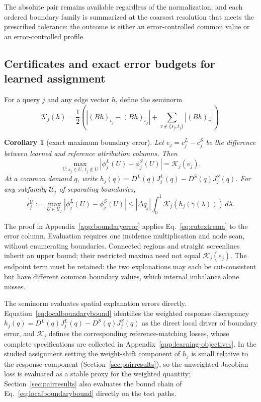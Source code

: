 \documentclass[a4paper,fleqn]{cas-sc}
\newtheorem{corollary}[theorem]{Corollary}
\begin{document}
\noindent The absolute pair remains available regardless of the
normalization, and each ordered boundary family is summarized at the
coarsest resolution that meets the prescribed tolerance: the outcome is
either an error-controlled common value or an error-controlled
profile.



\subsection{Certificates and exact error budgets for learned assignment}\label{sec:boundarylearning}
For a query $j$ and any edge vector $h$, define the seminorm
\begin{equation}
\mathcal K_j(h)=\frac12\left(\left|(Bh)_{t_j}-(Bh)_{s_j}\right|
+\sum_{v\notin\{s_j,t_j\}}|(Bh)_v|\right).
\label{eq:boundaryseminorm}
\end{equation}
\begin{corollary}[exact maximum boundary error]\label{cor:boundaryerror}
Let $e_j=c^L_j-c^S_j$ be the difference
between learned and reference attribution columns. Then
\begin{equation}
\max_{U:s_j\in U,\ t_j\notin U}|\phi_j^L(U)-\phi_j^S(U)|
=\mathcal K_j(e_j).\label{eq:exactboundaryerror}
\end{equation}
At a common demand $q$, write
$h_j(q)=D^L(q)J_j^L(q)-D^S(q)J_j^S(q)$.
For any subfamily $\mathcal U_j$ of separating boundaries,
\begin{equation}
\epsilon_j^{\mathcal U}:=\max_{U\in\mathcal U_j}|\phi_j^L(U)-\phi_j^S(U)|
\le |\Delta q_j|\int_0^1\mathcal K_j(h_j(\gamma(\lambda)))\,d\lambda.
\label{eq:localboundarybound}
\end{equation}
\end{corollary}
The proof in Appendix~\ref{app:boundaryerror} applies
Eq.~\eqref{eq:cutextrema} to the error column. Evaluation requires one
incidence multiplication and node scan, without enumerating boundaries.
Connected regions and straight screenlines inherit an upper bound; their
restricted maxima need not equal $\mathcal K_j(e_j)$. The endpoint term
must be retained: the two explanations may each be cut-consistent but
have different common boundary values, which internal imbalance alone misses.

The seminorm evaluates spatial explanation errors directly.
Equation~\eqref{eq:localboundarybound} identifies the weighted response
discrepancy $h_j(q)=D^L(q)J_j^L(q)-D^S(q)J_j^S(q)$ as the direct local
driver of boundary error, and $\mathcal K_j$ defines the corresponding
reference-matching losses, whose complete specifications are collected
in Appendix~\ref{app:learning-objectives}. In the studied assignment
setting the weight-shift component of $h_j$ is small relative to the
response component (Section~\ref{sec:pairresults}), so the unweighted
Jacobian loss is evaluated as a stable proxy for the weighted quantity;
Section~\ref{sec:pairresults} also evaluates the bound chain of
Eq.~\eqref{eq:localboundarybound} directly on the test paths.
\end{document}
